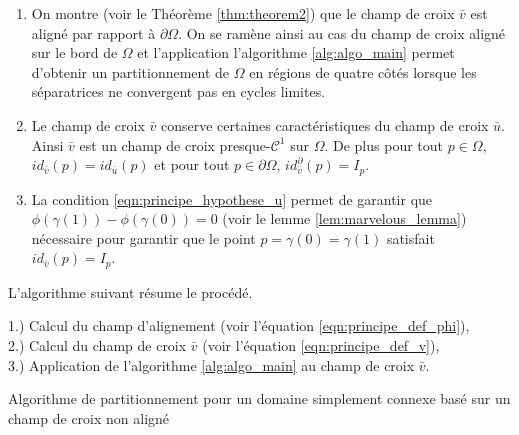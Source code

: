\begin{remark}
    \[\]
    \vspace{-1cm}
    \begin{enumerate}
        \item On montre (voir le Théorème \ref{thm:theorem2}) que le champ de croix $\bar{v}$ est aligné par rapport à $\partial\Omega$. On se ramène ainsi au cas du champ de croix aligné sur le bord de $\Omega$ et l'application l'algorithme \ref{alg:algo_main} permet d'obtenir un partitionnement de $\Omega$ en régions de quatre côtés lorsque les séparatrices ne convergent pas en cycles limites.\\
        \item Le champ de croix $\bar{v}$ conserve certaines caractéristiques du champ de croix $\bar{u}$. Ainsi $\bar{v}$ est un champ de croix presque-$\mathcal{C}^1$ sur $\Omega$. De plus pour tout $p\in\Omega$, $id_{\bar{v}}(p)=id_{\bar{u}}(p)$ et pour tout $p\in\partial\Omega$, $id^\partial_{\bar{v}}(p)=I_p$.\\
        \item La condition \eqref{eqn:principe_hypothese_u} permet de garantir que $\phi(\gamma(1))-\phi(\gamma(0))=0$ (voir le lemme \ref{lem:marvelous_lemma}) nécessaire pour garantir que le point $p=\gamma(0)=\gamma(1)$ satisfait $id_{\bar{v}}(p)=I_p$.%
    \end{enumerate}
\end{remark}

 L'algorithme suivant résume le procédé.

\vspace{0.5cm}
\begin{algorithm}[H]
\label{alg:algo_simply_connected}
\vspace{0.2cm}
1.) Calcul du champ d'alignement (voir l'équation \eqref{eqn:principe_def_phi}),\\\vspace{0.2cm}
2.) Calcul du champ de croix $\bar{v}$ (voir l'équation \eqref{eqn:principe_def_v}),\\\vspace{0.2cm}
3.) Application de l'algorithme \ref{alg:algo_main} au champ de croix $\bar{v}$.\\\vspace{0.2cm}
\caption{Algorithme de partitionnement pour un domaine simplement connexe basé sur un champ de croix non aligné}
\end{algorithm}
\vspace{0.5cm}

